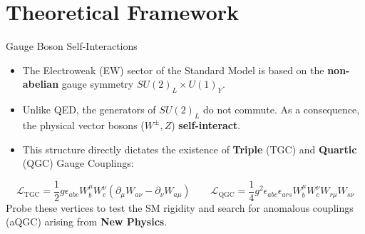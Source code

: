 \section{Theoretical Framework}
\begin{frame}{Gauge Boson Self-Interactions}
    \begin{itemize}
        \item The Electroweak (EW) sector of the Standard Model is based on the \textbf{non-abelian} gauge symmetry $SU(2)_L \times U(1)_Y$.
        \item Unlike QED, the generators of $SU(2)_L$ do not commute. As a consequence, the physical vector bosons ($W^\pm, Z$) \textbf{self-interact}.
        \item This structure directly dictates the existence of \textbf{Triple} (TGC) and \textbf{Quartic} (QGC) Gauge Couplings:
    \end{itemize}
    
    \begin{equation*}
        \mathcal{L}_{\text{TGC}} = \frac{1}{2}g \epsilon_{abc} W_b^\mu W_c^\nu (\partial_\mu W_{a\nu} - \partial_\nu W_{a\mu}) \qquad  \mathcal{L}_{\text{QGC}}= \frac{1}{4}g^2 \epsilon_{abc} \epsilon_{ars} W_b^\mu W_c^\nu W_{r\mu} W_{s\nu} 
    \end{equation*}
 Probe these vertices to test the SM rigidity and search for anomalous couplings (aQGC) arising from \textbf{New Physics}.
\end{frame}

